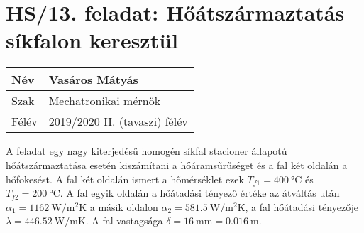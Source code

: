 \section*{HS/13. feladat: Hőátszármaztatás síkfalon keresztül}

\begin{tabular}{ | p{2cm} | p{14cm} | } 
	\hline
	Név & Vasáros Mátyás \\ 
	\hline
	Szak & Mechatronikai mérnök\\ 
	\hline
	Félév & 2019/2020 II. (tavaszi) félév \\ 
	\hline
\end{tabular}
\vspace{0.5cm}

\noindent A feladat egy nagy kiterjedésű homogén síkfal stacioner állapotú hőátszármaztatása esetén kiszámítani a hőáramsűrűséget és a fal két oldalán a hőfokesést. A fal két oldalán ismert a hőmérséklet ezek $T_{f1}=\SI{400}{\degreeCelsius}$ és $T_{f2}=\SI{200}{\degreeCelsius}$. A fal egyik oldalán a hőátadási tényező értéke az átváltás után $\alpha_1=\SI{1162}{\watt\per\meter\squared\kelvin}$ a másik oldalon $\alpha_2=\SI{581,5}{\watt\per\meter\squared\kelvin}$, a fal hőátadási tényezője $\lambda=\SI{446,52}{\watt\per\meter\kelvin}$. A fal vastagsága $\delta=\SI {16}{\milli\meter}=\SI {0,016}{\meter}$.

